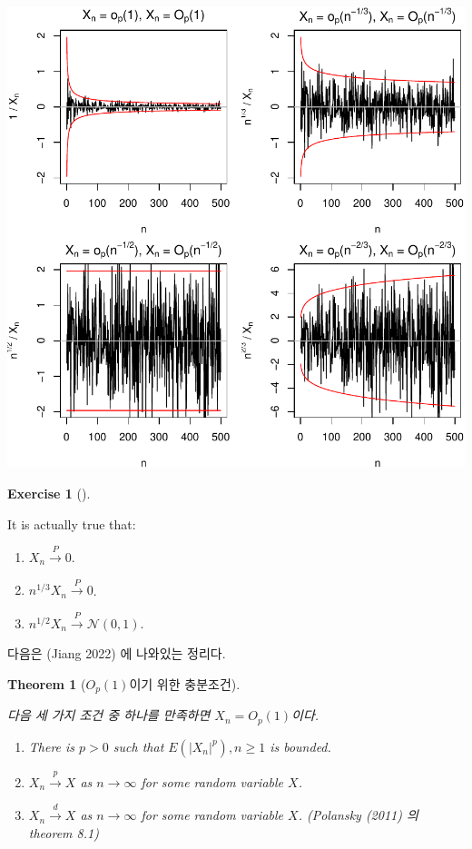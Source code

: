 \documentclass[
  13pt,
  letterpaper,
  DIV=11,
  numbers=noendperiod]{scrreprt}
\theoremstyle{plain}
\theoremstyle{definition}
\theoremstyle{definition}
\theoremstyle{plain}
\theoremstyle{definition}
\newtheorem{exercise}{Exercise}[chapter]
\theoremstyle{plain}
\newtheorem{theorem}{Theorem}[chapter]
\theoremstyle{remark}
\begin{document}
\begin{center}
\includegraphics{bigoh_files/figure-pdf/unnamed-chunk-2-1.pdf}
\end{center}

\begin{exercise}[]\protect\hypertarget{exr-probconvexr}{}\label{exr-probconvexr}

It is actually true that:

\begin{enumerate}
\def\labelenumi{\arabic{enumi}.}
\item
  \(X_n \stackrel{P}{\rightarrow}0\).
\item
  \(n^{1/3}X_n \stackrel{P}{\rightarrow} 0\).
\item
  \(n^{1/2}X_n \stackrel{P}{\rightarrow} \mathcal{N}(0,1)\).
\end{enumerate}

\end{exercise}

다음은 (Jiang 2022) 에 나와있는 정리다.

\begin{theorem}[\(O_p(1)\)이기 위한
충분조건]\protect\hypertarget{thm-suffbigop}{}\label{thm-suffbigop}

다음 세 가지 조건 중 하나를 만족하면 \(X_n = O_p(1)\)이다.

\begin{enumerate}
\def\labelenumi{\arabic{enumi}.}
\item
  There is \(p>0\) such that \(E(|X_n|^p), n\geq 1\) is bounded.
\item
  \(X_n\stackrel{p}{\rightarrow}X\) as \(n\rightarrow\infty\) for some
  random variable \(X\).
\item
  \(X_n \stackrel{d}{\rightarrow}X\) as \(n\rightarrow\infty\) for some
  random variable \(X\). (Polansky (2011) 의 theorem 8.1)
\end{enumerate}

\end{theorem}
\end{document}
